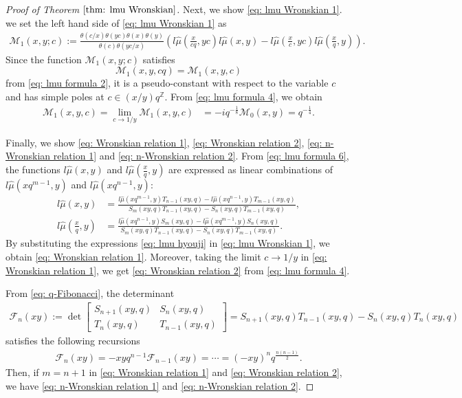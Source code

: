 \documentclass[a4paper]{article}
\newcommand{\Zz}{\mathbb{Z}}
\numberwithin{equation}{section}
\theoremstyle{plain}
\begin{document}
\begin{proof}[Proof of Theorem $\ref{thm: lmu Wronskian}$]
Next, we show \eqref{eq: lmu Wronskian 1}. we set the left hand side of \eqref{eq: lmu Wronskian 1} as
\begin{align*}
\mathcal{M}_1(x,y;c):=\frac{\theta(c/x)\theta(yc)\theta(x)\theta(y)}{\theta(c)\theta(yc/x)}\left(l\widehat{\mu}\left(\frac{x}{cq},yc\right)l\widehat{\mu}\left(x,y\right)-l\widehat{\mu}\left(\frac{x}{c},yc\right)l\widehat{\mu}\left(\frac{x}{q},y\right)\right). 
\end{align*}
Since the function $\mathcal{M}_1(x,y;c)$ satisfies 
$$\mathcal{M}_1(x,y,c q)=\mathcal{M}_1(x,y,c)$$
from \eqref{eq: lmu formula 2}, 
it is a pseudo-constant with respect to the variable $c$ and has simple poles at $c\in (x/y)q^\Zz$. 
From \eqref{eq: lmu formula 4}, we obtain
\begin{align*}
\mathcal{M}_1(x,y,c)=\lim_{c\to 1/y}\mathcal{M}_1(x,y,c)
  &=-iq^{-\frac{1}{8}}\mathcal{M}_0(x,y)=q^{-\frac{1}{4}}. 
\end{align*}


Finally, we show \eqref{eq: Wronskian relation 1}, \eqref{eq: Wronskian relation 2}, \eqref{eq: n-Wronskian relation 1} and \eqref{eq: n-Wronskian relation 2}. 
From \eqref{eq: lmu formula 6}, the functions $l\widehat{\mu}\left(x,y\right)$ and $l\widehat{\mu}\left(\frac{x}{q},y\right)$ are expressed as linear combinations of $l\widehat{\mu}(x q^{m-1},y)$ and $l\widehat{\mu}(x q^{n-1},y)$: 
\begin{align}
l\widehat{\mu}\left(x,y\right)
  &=
  \frac{l\widehat{\mu}(x q^{m-1},y)T_{n-1}(xy,q)-l\widehat{\mu}(x q^{n-1},y)T_{m-1}(xy,q)}{S_m(xy,q)T_{n-1}(xy,q)-S_n(xy,q)T_{m-1}(xy,q)}
  , \nonumber \\
\label{eq: lmu hyouji}
  l\widehat{\mu}\left(\frac{x}{q},y\right)
  &=
  \frac{l\widehat{\mu}(x q^{n-1},y)S_m(xy,q)-l\widehat{\mu}(x q^{m-1},y)S_n(xy,q)}{S_m(xy,q)T_{n-1}(xy,q)-S_n(xy,q)T_{m-1}(xy,q)}. 
\end{align}
By substituting the expressions \eqref{eq: lmu hyouji} in \eqref{eq: lmu Wronskian 1}, we obtain \eqref{eq: Wronskian relation 1}. 
Moreover, taking the limit $c\to 1/y$ in \eqref{eq: Wronskian relation 1}, we get \eqref{eq: Wronskian relation 2} from \eqref{eq: lmu formula 4}. 

From \eqref{eq: q-Fibonacci}, the determinant
\begin{align*}
\mathcal{F}_n(xy):=\det \begin{bmatrix}
S_{n+1}(xy,q) & S_{n}(xy,q) \\
T_{n}(xy,q) & T_{n-1}(xy,q)
\end{bmatrix}=S_{n+1}(xy,q)T_{n-1}(xy,q)-S_{n}(xy,q)T_{n}(xy,q)
\end{align*}
satisfies the following recursions
\begin{align*}
\mathcal{F}_n(xy)=-xyq^{n-1}\mathcal{F}_{n-1}(xy)=\cdots=(-xy)^nq^\frac{n(n-1)}{2}. 
\end{align*}
Then, if $m=n+1$ in \eqref{eq: Wronskian relation 1} and \eqref{eq: Wronskian relation 2},  we have \eqref{eq: n-Wronskian relation 1} and \eqref{eq: n-Wronskian relation 2}. 
\end{proof}
\end{document}
